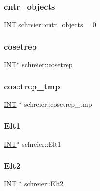 \subsubsection{\texorpdfstring{cntr\+\_\+objects}{cntr\_objects}}
{\footnotesize\ttfamily \mbox{\hyperlink{galois_8h_a09fddde158a3a20bd2dcadb609de11dc}{I\+NT}} schreier\+::cntr\+\_\+objects = 0\hspace{0.3cm}{\ttfamily [static]}}

\mbox{\label{classschreier_ad9f8726a9f58f398d59cc1713176a861}} 
\subsubsection{\texorpdfstring{cosetrep}{cosetrep}}
{\footnotesize\ttfamily \mbox{\hyperlink{galois_8h_a09fddde158a3a20bd2dcadb609de11dc}{I\+NT}}$\ast$ schreier\+::cosetrep}

\mbox{\label{classschreier_af34b3c094cd7a4800084239ccaa8cbe4}} 
\subsubsection{\texorpdfstring{cosetrep\+\_\+tmp}{cosetrep\_tmp}}
{\footnotesize\ttfamily \mbox{\hyperlink{galois_8h_a09fddde158a3a20bd2dcadb609de11dc}{I\+NT}} $\ast$ schreier\+::cosetrep\+\_\+tmp}

\mbox{\label{classschreier_ae3da4a3a244676c1b9b1b9c927475951}} 
\subsubsection{\texorpdfstring{Elt1}{Elt1}}
{\footnotesize\ttfamily \mbox{\hyperlink{galois_8h_a09fddde158a3a20bd2dcadb609de11dc}{I\+NT}}$\ast$ schreier\+::\+Elt1}

\mbox{\label{classschreier_a43ffffe6663024c7690b38e95efec968}} 
\subsubsection{\texorpdfstring{Elt2}{Elt2}}
{\footnotesize\ttfamily \mbox{\hyperlink{galois_8h_a09fddde158a3a20bd2dcadb609de11dc}{I\+NT}} $\ast$ schreier\+::\+Elt2}


